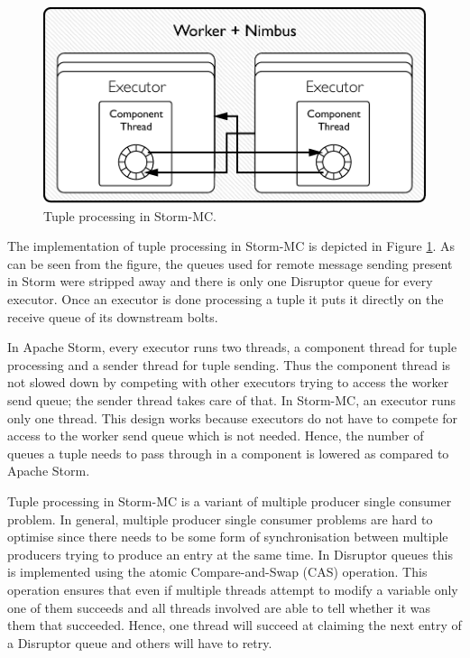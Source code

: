 \documentclass[bsc,twoside,singlespacing,normalheadings,parskip]{infthesis}\usepackage[]{graphicx}\usepackage[]{color}
\begin{document}
\begin{figure}[!htb]
	\centering
	\includegraphics[scale=0.7]{pdf/worker_inside_mc.pdf}
	\caption{Tuple processing in Storm-MC.}
	\label{fig:worker_inside_mc}
\end{figure}

The implementation of tuple processing in Storm-MC is depicted in Figure \ref{fig:worker_inside_mc}. As can be seen from the figure, the queues used for remote message sending present in Storm were stripped away and there is only one Disruptor queue for every executor. Once an executor is done processing a tuple it puts it directly on the receive queue of its downstream bolts.

In Apache Storm, every executor runs two threads, a component thread for tuple processing and a sender thread for tuple sending. Thus the component thread is not slowed down by competing with other executors trying to access the worker send queue; the sender thread takes care of that. In Storm-MC, an executor runs only one thread. This design works because executors do not have to compete for access to the worker send queue which is not needed. Hence, the number of queues a tuple needs to pass through in a component is lowered as compared to Apache Storm.

Tuple processing in Storm-MC is a variant of multiple producer single consumer problem. In general, multiple producer single consumer problems are hard to optimise since there needs to be some form of synchronisation between multiple producers trying to produce an entry at the same time. In Disruptor queues this is implemented using the atomic Compare-and-Swap (CAS) operation. This operation ensures that even if multiple threads attempt to modify a variable only one of them succeeds and all threads involved are able to tell whether it was them that succeeded. Hence, one thread will succeed at claiming the next entry of a Disruptor queue and others will have to retry.
\end{document}

